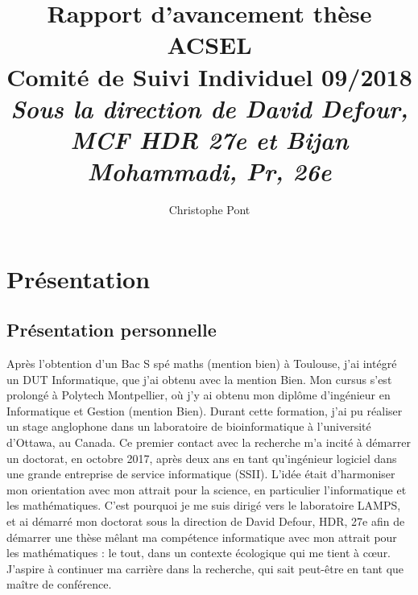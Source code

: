 \documentclass[a4paper,11pt]{article}
\title{%
  Rapport d'avancement thèse ACSEL \\
  \large Comité de Suivi Individuel 09/2018 \\ %
  \large \textit{Sous la direction de David Defour, MCF HDR 27e et Bijan Mohammadi, Pr, 26e}}
\author{Christophe Pont}
\begin{document}
\maketitle
\tableofcontents

\begin{abstract}
\end{abstract}

\section{Présentation}

\subsection{Présentation personnelle}
Après l’obtention d’un Bac S spé maths (mention bien) à Toulouse, j’ai intégré un DUT Informatique, que j'ai obtenu avec la mention Bien. Mon cursus s’est prolongé à Polytech Montpellier, où j’y ai obtenu mon diplôme d’ingénieur en Informatique et Gestion (mention Bien). Durant cette formation, j’ai pu réaliser un stage anglophone dans un laboratoire de bioinformatique à l’université d’Ottawa, au Canada. Ce premier contact avec la recherche m’a incité à démarrer un doctorat, en octobre 2017, après deux ans en tant qu’ingénieur logiciel dans une grande entreprise de service informatique (SSII). L’idée était d’harmoniser mon orientation avec mon attrait pour la science, en particulier l’informatique et les mathématiques. C’est pourquoi je me suis dirigé vers le laboratoire LAMPS, et ai démarré mon doctorat sous la direction de David Defour, HDR, 27e afin de démarrer une thèse mêlant ma compétence informatique avec mon attrait pour les mathématiques : le tout, dans un contexte écologique qui me tient à cœur. J’aspire à continuer ma carrière dans la recherche, qui sait peut-être en tant que maître de conférence.

\end{document}

